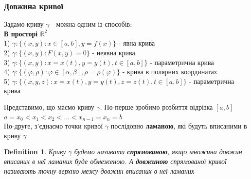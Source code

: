 \documentclass[a4paper, 14pt]{extarticle}
\theoremstyle{theoremdd}
\theoremstyle{theoremdd}
\newtheorem{definition}[theorem]{Definition}
\theoremstyle{theoremdd}
\theoremstyle{theoremdd}
\theoremstyle{theoremdd}
\theoremstyle{theoremdd}
\theoremstyle{theoremdd}
\theoremstyle{theoremdd}
\begin{document}
\subsubsection{Довжина кривої}
Задамо криву $\gamma$ - можна одним із способів:\\
\textbf{В просторі $\mathbb{R}^2$}\\
1) $\gamma: \{(x,y): x \in [a,b], y = f(x)\}$ - явна крива\\
2) $\gamma: \{(x,y): F(x,y) = 0\}$ - неявна крива\\
3) $\gamma: \{(x,y): x = x(t), y = y(t), t \in [a,b]\}$ - параметрична крива\\
4) $\gamma: \{(\varphi, \rho): \varphi \in [\alpha,\beta], \rho = \rho(\varphi)\}$ - крива в полярних координатах\\
5) $\gamma: \{(x,y,z): x = x(t), y = y(t), z = z(t), t \in [a,b]\}$ - параметрична крива

Представимо, що маємо криву $\gamma$. По-перше зробимо розбиття відрізка $[a,b]$\\
$a = x_0 < x_1 < x_2 < \dots < x_{n-1} = x_n = b$\\
По-друге, з'єднаємо точки кривої $\gamma$ послідовно \textbf{ламаною}, які будуть вписаними в криву $\gamma$

\begin{figure}[H]
\centering
{}
\end{figure}

\begin{definition}
Криву $\gamma$ будемо називати \textbf{спрямованою}, якщо множина довжин вписаних в неї ламаних буде обмеженою. А \textbf{довжиною} спрямованої кривої називають точну верхню межу довжин вписаних в неї ламаних
\end{definition}
\end{document}
